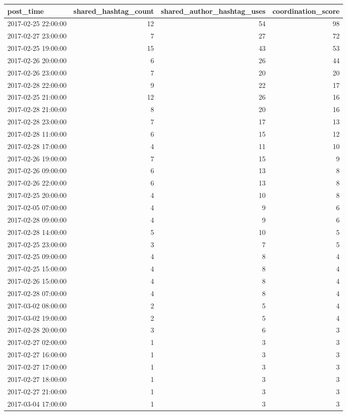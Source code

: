 \begin{tabular}{lrrr}
\toprule
post\_time & shared\_hashtag\_count & shared\_author\_hashtag\_uses & coordination\_score \\
\midrule
2017-02-25 22:00:00 & 12 & 54 & 98 \\
2017-02-27 23:00:00 & 7 & 27 & 72 \\
2017-02-25 19:00:00 & 15 & 43 & 53 \\
2017-02-26 20:00:00 & 6 & 26 & 44 \\
2017-02-26 23:00:00 & 7 & 20 & 20 \\
2017-02-28 22:00:00 & 9 & 22 & 17 \\
2017-02-25 21:00:00 & 12 & 26 & 16 \\
2017-02-28 21:00:00 & 8 & 20 & 16 \\
2017-02-28 23:00:00 & 7 & 17 & 13 \\
2017-02-28 11:00:00 & 6 & 15 & 12 \\
2017-02-28 17:00:00 & 4 & 11 & 10 \\
2017-02-26 19:00:00 & 7 & 15 & 9 \\
2017-02-26 09:00:00 & 6 & 13 & 8 \\
2017-02-26 22:00:00 & 6 & 13 & 8 \\
2017-02-25 20:00:00 & 4 & 10 & 8 \\
2017-02-05 07:00:00 & 4 & 9 & 6 \\
2017-02-28 09:00:00 & 4 & 9 & 6 \\
2017-02-28 14:00:00 & 5 & 10 & 5 \\
2017-02-25 23:00:00 & 3 & 7 & 5 \\
2017-02-25 09:00:00 & 4 & 8 & 4 \\
2017-02-25 15:00:00 & 4 & 8 & 4 \\
2017-02-26 15:00:00 & 4 & 8 & 4 \\
2017-02-28 07:00:00 & 4 & 8 & 4 \\
2017-03-02 08:00:00 & 2 & 5 & 4 \\
2017-03-02 19:00:00 & 2 & 5 & 4 \\
2017-02-28 20:00:00 & 3 & 6 & 3 \\
2017-02-27 02:00:00 & 1 & 3 & 3 \\
2017-02-27 16:00:00 & 1 & 3 & 3 \\
2017-02-27 17:00:00 & 1 & 3 & 3 \\
2017-02-27 18:00:00 & 1 & 3 & 3 \\
2017-02-27 21:00:00 & 1 & 3 & 3 \\
2017-03-04 17:00:00 & 1 & 3 & 3 \\

\end{tabular}

